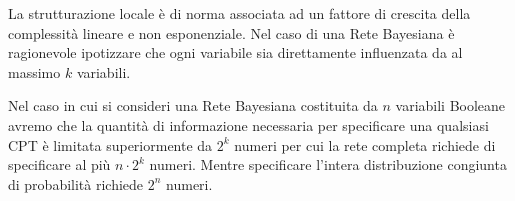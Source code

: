 La strutturazione locale è di norma associata ad un fattore di crescita della
complessità lineare e non esponenziale. Nel caso di una Rete Bayesiana è ragionevole
ipotizzare che ogni variabile sia direttamente influenzata da al massimo $k$
variabili.

Nel caso in cui si consideri una Rete Bayesiana costituita da $n$ variabili
Booleane avremo che la quantità di informazione necessaria per specificare una
qualsiasi CPT è limitata superiormente da $2^k$ numeri per cui la rete completa
richiede di specificare al più $n \cdot 2^k$ numeri. Mentre specificare l'intera
distribuzione congiunta di probabilità richiede $2^n$ numeri.